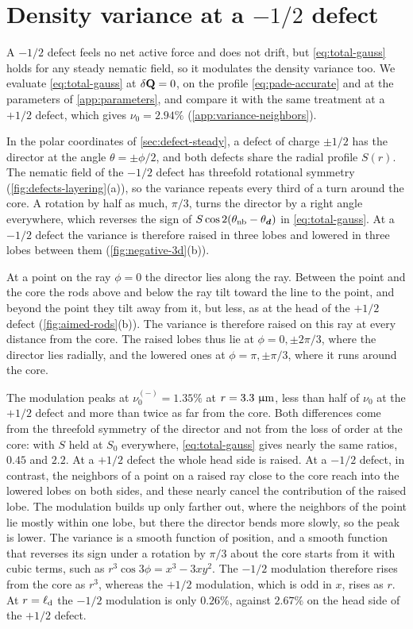 \documentclass[aps,pre,reprint,superscriptaddress,longbibliography,nofootinbib
]{revtex4-2}
\begin{document}
\section{Density variance at a $-1/2$ defect}
\label{app:negative}
A $-1/2$ defect feels no net active force and does not
drift, but \cref{eq:total-gauss} holds for any steady
nematic field, so it modulates the density variance too. We
evaluate \cref{eq:total-gauss} at $\delta\mathbf{Q}=0$, on the
profile \cref{eq:pade-accurate} and at the parameters of
\cref{app:parameters}, and compare it with the same
treatment at a $+1/2$ defect, which gives $\nu_0=2.94\%$
(\cref{app:variance-neighbors}).


In the polar coordinates of \cref{sec:defect-steady}, a
defect of charge $\pm1/2$ has the director at the angle
$\theta=\pm\phi/2$, and both defects share the radial
profile $S(r)$. The nematic field of the $-1/2$ defect has
threefold rotational symmetry
(\cref{fig:defects-layering}(a)), so the variance repeats
every third of a turn around the core. A rotation by half
as much, $\pi/3$, turns the director by a right angle
everywhere, which reverses the sign of
$S\cos2(\theta_\text{nb}-\theta_{\boldsymbol d})$ in
\cref{eq:total-gauss}. At a $-1/2$ defect the variance is
therefore raised in three lobes and lowered in three lobes
between them (\cref{fig:negative-3d}(b)).

At a point on the ray $\phi=0$ the director lies along the
ray. Between the point and the core the rods above and
below the ray tilt toward the line to the point, and beyond
the point they tilt away from it, but less, as at the head
of the $+1/2$ defect (\cref{fig:aimed-rods}(b)). The
variance is therefore raised on this ray at every distance
from the core. The raised lobes thus lie at
$\phi=0,\pm2\pi/3$, where the director lies radially, and
the lowered ones at $\phi=\pi,\pm\pi/3$, where it runs
around the core.

The modulation peaks at $\nu_0^{(-)}=1.35\%$ at
$r=3.3~\upmu\mathrm{m}$, less than half of $\nu_0$ at the $+1/2$
defect and more than twice as far from the core. Both
differences come from the threefold symmetry of the
director and not from the loss of order at the core: with
$S$ held at $S_0$ everywhere, \cref{eq:total-gauss} gives
nearly the same ratios, $0.45$ and $2.2$. At a $+1/2$
defect the whole head side is raised. At a $-1/2$ defect,
in contrast, the neighbors of a point on a raised ray close
to the core reach into the lowered lobes on both sides, and
these nearly cancel the contribution of the raised lobe.
The modulation builds up only farther out, where the
neighbors of the point lie mostly within one lobe, but
there the director bends more slowly, so the peak is lower.
The variance is a smooth function of position, and a smooth
function that reverses its sign under a rotation by $\pi/3$
about the core starts from it with cubic terms, such as
$r^3\cos3\phi=x^3-3xy^2$. The $-1/2$ modulation therefore
rises from the core as $r^3$, whereas the $+1/2$
modulation, which is odd in $x$, rises as $r$. At $r=\ell_{\rm d}$
the $-1/2$ modulation is only $0.26\%$, against $2.67\%$ on
the head side of the $+1/2$ defect.
\end{document}
